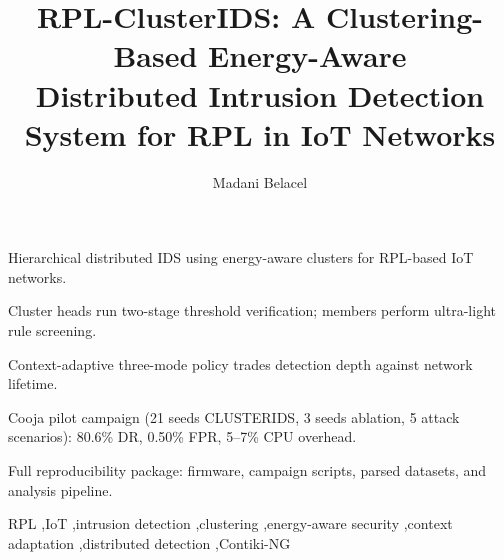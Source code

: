 \documentclass[preprint,12pt,number]{elsarticle}
\begin{document}
\begin{frontmatter}

\title{RPL-ClusterIDS: A Clustering-Based Energy-Aware\\Distributed Intrusion Detection System for RPL in IoT Networks}

\author[univ]{Madani Belacel}
\cormark[1]



\begin{highlights}
\item Hierarchical distributed IDS using energy-aware clusters for RPL-based IoT networks.
\item Cluster heads run two-stage threshold verification; members perform ultra-light rule screening.
\item Context-adaptive three-mode policy trades detection depth against network lifetime.
\item Cooja pilot campaign (21 seeds CLUSTERIDS, 3 seeds ablation, 5 attack scenarios): 80.6\% DR, 0.50\% FPR, 5--7\% CPU overhead.
\item Full reproducibility package: firmware, campaign scripts, parsed datasets, and analysis pipeline.
\end{highlights}

\begin{abstract}

\end{abstract}

\begin{keyword}
RPL \sep IoT \sep intrusion detection \sep clustering \sep energy-aware security \sep context adaptation \sep distributed detection \sep Contiki-NG
\end{keyword}

\end{frontmatter}















\end{document}
